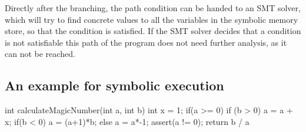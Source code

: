 Directly after the branching, the path condition can be handed to an SMT solver, which will try to find concrete values to all the variables in the symbolic memory store, so that the condition is satisfied. If the SMT solver decides that a condition is not satisfiable this path of the program does not need further analysis, as it can not be reached.
\subsection{An example for symbolic execution}
\begin{codesnippet}[caption={Simple Symbolic Execution Example}, label={codeSnippet:symbolicExecution}]
int calculateMagicNumber(int a, int b){
   int x = 1;
   if(a >= 0){
      if (b > 0){
         a = a + x;
      }
      if(b < 0){
        a = (a+1)*b;
      }
   }else{
     a = a*-1;
   }
  assert(a != 0);
  return b / a
}
\end{codesnippet}
